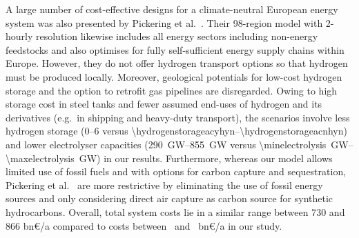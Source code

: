A large number of cost-effective designs for a climate-neutral European energy
system was also presented by Pickering et
al.~\cite{pickeringDiversityOptions2022}. Their 98-region model with 2-hourly
resolution likewise includes all energy sectors including non-energy feedstocks
and also optimises for fully self-sufficient energy supply chains within Europe.
However, they do not offer hydrogen transport options so that hydrogen must be
produced locally. Moreover, geological potentials for low-cost hydrogen storage
and the option to retrofit gas pipelines are disregarded. Owing to high storage
cost in steel tanks and fewer assumed end-uses of hydrogen and its derivatives
(e.g.~in shipping and heavy-duty transport), the scenarios involve less hydrogen
storage (\SIrange{0}{6}{\twh} versus
\SIrange{\hydrogenstorageacyhyn}{\hydrogenstorageacnhyn}{\twh}) and lower
electrolyser capacities (\SIrange{290}{855}{\giga\watt} versus
\SIrange{\minelectrolysis}{\maxelectrolysis}{\giga\watt}) in our results.
Furthermore, whereas our model allows limited use of fossil fuels and with
options for carbon capture and sequestration, Pickering et
al.~\cite{pickeringDiversityOptions2022} are more restrictive by eliminating the
use of fossil energy sources and only considering direct air capture as carbon
source for synthetic hydrocarbons. Overall, total system costs lie in a similar
range between 730 and 866 bn\euro/a compared to costs between \minsystemcost~and
\maxsystemcost~bn\euro/a in our study. 





